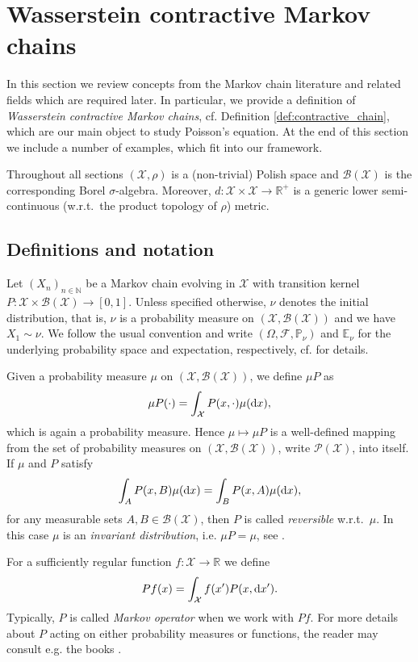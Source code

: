 \documentclass[12pt]{article}
\theoremstyle{plain}
\renewcommand{\d}{{\rm d}}
\newcommand{\N}{\mathbb{N}}
\newcommand{\E}{\mathbb{E}}
\newcommand{\R}{\mathbb{R}}
\newcommand{\cX}{\mathcal{X}}
\begin{document}
\section{Wasserstein contractive Markov chains}\label{sec:Wasserstein_contractive_chains}
In this section we review concepts from the Markov chain literature and related fields which are required later.
In particular, we provide a definition of \textit{Wasserstein contractive Markov chains}, cf. Definition \ref{def:contractive_chain}, which are our main object to study Poisson's equation. 
At the end of this section we include a number of examples, which fit into our framework.



Throughout all sections $(\cX , \rho)$ is a (non-trivial) Polish space and $\mathcal{B}(\cX)$ is the corresponding Borel $\sigma$-algebra. Moreover, $d \colon \cX \times \cX \to \R^+$ is a generic lower semi-continuous (w.r.t.~the product topology of $\rho$) metric.   



\subsection{Definitions and notation}
Let $(X_n)_{n \in \N}$ be a Markov chain evolving in $\cX$ with transition kernel $P\colon \cX \times \mathcal{B}(\cX) \to [0,1]$. 
Unless specified otherwise, $\nu$ denotes the initial distribution, that is, $\nu$ is a probability measure on $(\cX, \mathcal{B}(\cX))$ and we have $X_1 \sim \nu$.
We follow the usual convention and write $(\Omega, \mathcal{F},\mathbb{P}_\nu)$ and $\E_\nu$ for the underlying probability space and expectation, respectively, cf. \cite{douc2018markov} for details.

Given a probability measure $\mu$ on $(\cX, \mathcal{B}(\cX))$, we define $\mu P$ as 
\[
\mu P (\cdot ) = \int_\cX P(x, \cdot) \mu(\d x),
\] 
which is again a probability measure. Hence $\mu \mapsto \mu P$ is a well-defined mapping from the set of probability measures on $(\cX , \mathcal{B}(\cX))$, write $\mathcal{P(\cX)}$, into itself. 
If $\mu$ and $P$ satisfy 
\[
\int_A P(x, B) \mu(\d x) = \int_B P(x, A) \mu(\d x),
\]
for any measurable sets $A, B \in \mathcal{B}(\cX)$, then $P$ is called \textit{reversible} w.r.t.~$\mu$. In this case $\mu$ is an \textit{invariant distribution}, i.e. $\mu P = \mu$, see \cite{douc2018markov}.  

For a sufficiently regular function $f\colon \cX \to \R$ we define 
\[
Pf (x) = \int_\cX f(x') P(x , \d x').
\]
Typically, $P$ is called \textit{Markov operator} when we work with $Pf$. For more details about $P$ acting on either probability measures or functions, the reader may consult e.g. the books \cite{meyn2009markov, douc2018markov}. 
\end{document}
